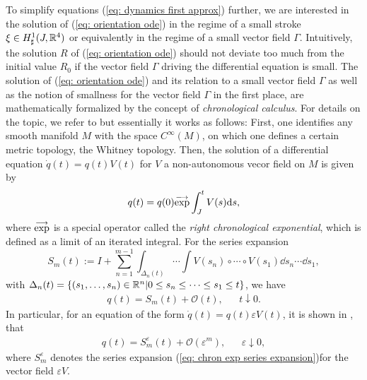 To simplify equations  (\ref{eq: dynamics first approx}) further, we are interested in the solution of (\ref{eq: orientation ode}) in the regime of a small stroke $\xi \in H_{\sharp}^1(J, \mathbb{R}^4)$ or equivalently in the regime of a small vector field $\Gamma$. Intuitively, the solution $R$ of (\ref{eq: orientation ode}) should not deviate too much from the initial value $R_0$ if the vector field $\Gamma$ driving the differential equation is small. The solution of (\ref{eq: orientation ode}) and its relation to a small vector field $\Gamma$ as well as the notion of smallness for the vector field $\Gamma$ in the first place, are mathematically formalized by the concept of \emph{chronological calculus}. For details on the topic, we refer to \cite{Agrachev2004} but essentially it works as follows: First, one identifies any smooth manifold $M$ with the space $C^{\infty}(M)$, on which one defines a certain metric topology, the Whitney topology. Then, the solution of a differential equation $\dot{q}(t) = q(t) V(t)$ for $V$ a non-autonomous vecor field on $M$ is given by
\begin{equation}
	q(t) = q(0)\overset{\longrightarrow}{\exp} \int_{J}^{t} V(s) \mathrm{d}s,
\end{equation}
where $\overset{\longrightarrow}{\exp}$ is a special operator called the \emph{right chronological exponential}, which is defined as a limit of an iterated integral. For the series expansion
\begin{equation}
\label{eq: chron exp series expansion}
S_m(t) := I + \sum_{n = 1}^{m-1} \int_{\Delta_n(t)} \dotsm \int V(s_n) \circ \dotsm \circ V(s_1) \dd s_n \dotsm \dd s_1,
\end{equation}
with $\Delta_n(t) = \{(s_1, \dotsc, s_n) \in \mathbb{R}^n | 0 \leq s_n \leq \dotsm \leq s_1 \leq t\}$, we have
\begin{align}
q(t) = S_m(t) + \mathcal{O}(t), & & t \downarrow 0.
\end{align}
In particular, for an equation of the form $\dot{q}(t) = q(t) \varepsilon V(t)$, it is shown in \cite{Agrachev2004}, that
\begin{align}
\label{eq: estimation of chronological exponential}
	q(t) = S_m^{\varepsilon}(t) + \mathcal{O}(\varepsilon^m), & & \varepsilon \downarrow 0,
\end{align}
where $S_{m}^{\varepsilon}$ denotes the series expansion (\ref{eq: chron exp series expansion})for the vector field $\varepsilon V$.


